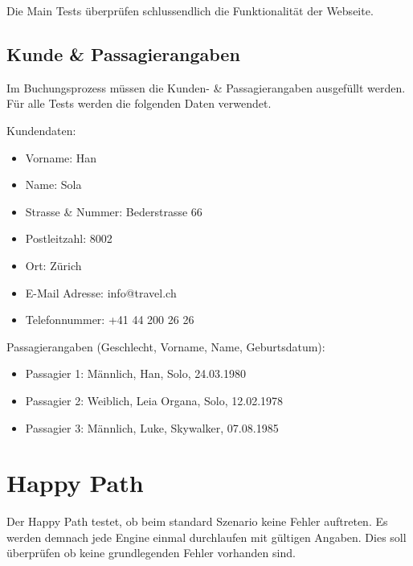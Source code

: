 Die Main Tests überprüfen schlussendlich die Funktionalität der Webseite.

\subsection{Kunde \& Passagierangaben}
\label{sec:Konzept:Übersicht:Angaben}
Im Buchungsprozess müssen die Kunden- \& Passagierangaben ausgefüllt werden. Für alle Tests werden die folgenden Daten verwendet.

Kundendaten:
\begin{itemize}
\item Vorname: Han
\item Name: Sola
\item Strasse \& Nummer: Bederstrasse 66
\item Postleitzahl: 8002
\item Ort: Zürich
\item E-Mail Adresse: info@travel.ch
\item Telefonnummer: +41 44 200 26 26 
\end{itemize}

Passagierangaben (Geschlecht, Vorname, Name, Geburtsdatum):
\begin{itemize}
\item Passagier 1: Männlich, Han, Solo, 24.03.1980
\item Passagier 2: Weiblich, Leia Organa, Solo, 12.02.1978
\item Passagier 3: Männlich, Luke, Skywalker, 07.08.1985
\end{itemize}

\section{Happy Path}
Der Happy Path testet, ob beim standard Szenario keine Fehler auftreten. Es werden demnach jede Engine einmal durchlaufen mit gültigen Angaben. Dies soll überprüfen ob keine grundlegenden Fehler vorhanden sind.
